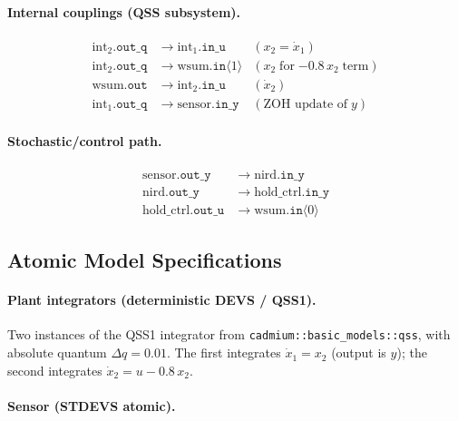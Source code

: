 \paragraph{Internal couplings (QSS subsystem).}
\begin{align*}
  \mathrm{int}_2.\texttt{out\_q} &\to \mathrm{int}_1.\texttt{in\_u}
    & (x_2 = \dot{x}_1) \\
  \mathrm{int}_2.\texttt{out\_q} &\to \mathrm{wsum}.\texttt{in}\langle 1\rangle
    & (x_2\;\text{for}\;{-0.8}\,x_2\;\text{term}) \\
  \mathrm{wsum}.\texttt{out}    &\to \mathrm{int}_2.\texttt{in\_u}
    & (\dot{x}_2) \\
  \mathrm{int}_1.\texttt{out\_q} &\to \mathrm{sensor}.\texttt{in\_y}
    & (\text{ZOH update of}\;y)
\end{align*}

\paragraph{Stochastic/control path.}
\begin{align*}
  \mathrm{sensor}.\texttt{out\_y}    &\to \mathrm{nird}.\texttt{in\_y} \\
  \mathrm{nird}.\texttt{out\_y}      &\to \mathrm{hold\_ctrl}.\texttt{in\_y} \\
  \mathrm{hold\_ctrl}.\texttt{out\_u}&\to \mathrm{wsum}.\texttt{in}\langle 0\rangle
\end{align*}

\subsection*{Atomic Model Specifications}

\paragraph{Plant integrators (deterministic DEVS / QSS1).}

Two instances of the QSS1 integrator from \texttt{cadmium::basic\_models::qss},
with absolute quantum $\Delta q = 0.01$.  The first integrates $\dot{x}_1 = x_2$
(output is $y$); the second integrates $\dot{x}_2 = u - 0.8\,x_2$.

\paragraph{Sensor (STDEVS atomic).}

